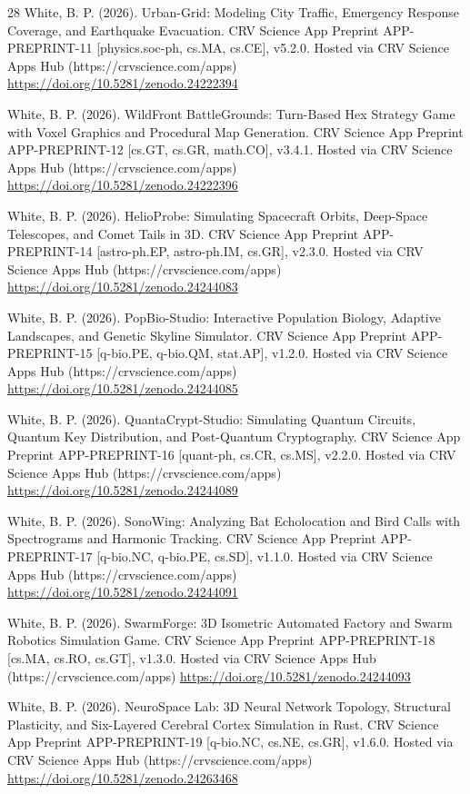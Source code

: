 \documentclass[10pt,letterpaper]{article}
\begin{document}
\begin{thebibliography}{28}
 White, B. P. (2026). Urban-Grid: Modeling City Traffic, Emergency Response Coverage, and Earthquake Evacuation. CRV Science App Preprint APP-PREPRINT-11 [physics.soc-ph, cs.MA, cs.CE], v5.2.0. Hosted via CRV Science Apps Hub (https://crvscience.com/apps) \url{https://doi.org/10.5281/zenodo.24222394}

 White, B. P. (2026). WildFront BattleGrounds: Turn-Based Hex Strategy Game with Voxel Graphics and Procedural Map Generation. CRV Science App Preprint APP-PREPRINT-12 [cs.GT, cs.GR, math.CO], v3.4.1. Hosted via CRV Science Apps Hub (https://crvscience.com/apps) \url{https://doi.org/10.5281/zenodo.24222396}

 White, B. P. (2026). HelioProbe: Simulating Spacecraft Orbits, Deep-Space Telescopes, and Comet Tails in 3D. CRV Science App Preprint APP-PREPRINT-14 [astro-ph.EP, astro-ph.IM, cs.GR], v2.3.0. Hosted via CRV Science Apps Hub (https://crvscience.com/apps) \url{https://doi.org/10.5281/zenodo.24244083}

 White, B. P. (2026). PopBio-Studio: Interactive Population Biology, Adaptive Landscapes, and Genetic Skyline Simulator. CRV Science App Preprint APP-PREPRINT-15 [q-bio.PE, q-bio.QM, stat.AP], v1.2.0. Hosted via CRV Science Apps Hub (https://crvscience.com/apps) \url{https://doi.org/10.5281/zenodo.24244085}

 White, B. P. (2026). QuantaCrypt-Studio: Simulating Quantum Circuits, Quantum Key Distribution, and Post-Quantum Cryptography. CRV Science App Preprint APP-PREPRINT-16 [quant-ph, cs.CR, cs.MS], v2.2.0. Hosted via CRV Science Apps Hub (https://crvscience.com/apps) \url{https://doi.org/10.5281/zenodo.24244089}

 White, B. P. (2026). SonoWing: Analyzing Bat Echolocation and Bird Calls with Spectrograms and Harmonic Tracking. CRV Science App Preprint APP-PREPRINT-17 [q-bio.NC, q-bio.PE, cs.SD], v1.1.0. Hosted via CRV Science Apps Hub (https://crvscience.com/apps) \url{https://doi.org/10.5281/zenodo.24244091}

 White, B. P. (2026). SwarmForge: 3D Isometric Automated Factory and Swarm Robotics Simulation Game. CRV Science App Preprint APP-PREPRINT-18 [cs.MA, cs.RO, cs.GT], v1.3.0. Hosted via CRV Science Apps Hub (https://crvscience.com/apps) \url{https://doi.org/10.5281/zenodo.24244093}

 White, B. P. (2026). NeuroSpace Lab: 3D Neural Network Topology, Structural Plasticity, and Six-Layered Cerebral Cortex Simulation in Rust. CRV Science App Preprint APP-PREPRINT-19 [q-bio.NC, cs.NE, cs.GR], v1.6.0. Hosted via CRV Science Apps Hub (https://crvscience.com/apps) \url{https://doi.org/10.5281/zenodo.24263468}


\end{thebibliography}
\end{document}
